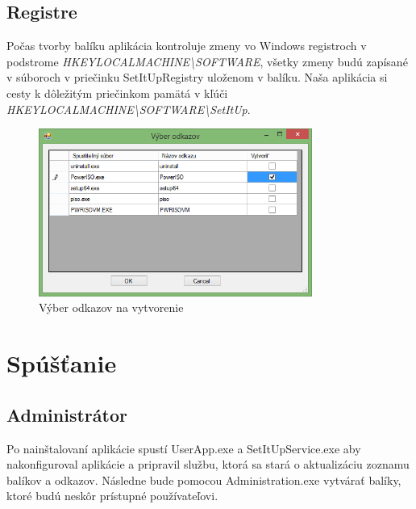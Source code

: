 \subsection{Registre}
Počas tvorby balíku aplikácia kontroluje zmeny vo Windows registroch v podstrome \textit{HKEY\textunderscore LOCAL\textunderscore MACHINE\textbackslash SOFTWARE}, všetky zmeny budú zapísané v súboroch v priečinku SetItUp\textunderscore Registry uloženom v balíku. Naša aplikácia si cesty k dôležitým priečinkom pamätá v kľúči \textit{HKEY\textunderscore LOCAL\textunderscore MACHINE\textbackslash SOFTWARE\textbackslash SetItUp}.
\begin{figure}[h]
    \centering
    \includegraphics[width=0.8\textwidth]{odkazy}
    \caption{Výber odkazov na vytvorenie}
    \label{fig:links}
\end{figure}

\section{Spúšťanie}
\subsection{Administrátor}
Po nainštalovaní aplikácie spustí UserApp.exe a SetItUpService.exe aby nakonfiguroval aplikácie a pripravil službu, ktorá sa stará o aktualizáciu zoznamu balíkov a odkazov. Následne bude pomocou Administration.exe vytvárať balíky, ktoré budú neskôr prístupné používateľovi.

